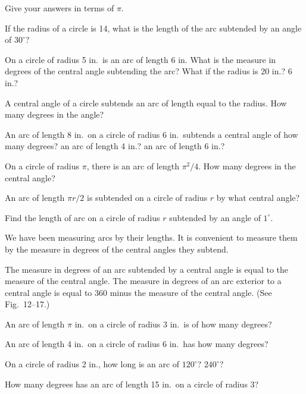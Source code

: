 \documentclass[11pt]{book}
\theoremstyle{bkplain}
\theoremstyle{XIplainnote}
\theoremstyle{bkplain}
\theoremstyle{bkplain}
\begin{document}
\FIGXIISIXTEEN

\begin{center}Give your answers in terms of $\pi$.\end{center}
\nopagebreak
\begin{exercisecols}
\begin{exlist}
\item If the radius of a circle is 14, what is the length of the arc subtended
      by an angle of $30^\circ$?
\item On a circle of radius 5 in.\ is an arc of length 6 in. What is the measure
      in degrees of the central angle subtending the arc? What if the radius is
      20 in.? 6 in.?
\item A central angle of a circle subtends an arc of length equal to the radius.
      How many degrees in the angle?
\item An arc of length 8 in.\ on a circle of radius 6 in.\ subtends a central
      angle of how many degrees? an arc of length 4 in.? an arc of length
      6 in.?
\item On a circle of radius $\pi$, there is an arc of length $\pi^2/4$. How many
      degrees in the central angle?
\item An arc of length $\pi r/2$ is subtended on a circle of radius $r$ by what
      central angle?
\item Find the length of arc on a circle of radius $r$ subtended by an angle of
      $1^\circ$.
\end{exlist}
\end{exercisecols}

We have been measuring arcs by their lengths. It is convenient to measure them
by the measure in degrees of the central angles they subtend.

\begin{definition}
The measure in degrees of an arc subtended by a central angle is equal to the
measure of the central angle. The measure in degrees of an arc exterior to a
central angle is equal to 360 minus the measure of the central angle. (See
Fig.~12--17.)
\end{definition}

\FIGXIISEVENTEENEIGHTEEN

\begin{exercisecols}
\begin{exlist}
\item An arc of length $\pi$ in.\ on a circle of radius 3 in.\ is of how many
      degrees?
\item An arc of length 4 in.\ on a circle of radius 6 in.\ has how many degrees?
\item On a circle of radius 2 in., how long is an arc of $120^\circ$?
      $240^\circ$?
\item How many degrees has an arc of length 15 in.\ on a circle of radius 3?
\end{exlist}
\end{exercisecols}
\end{document}
